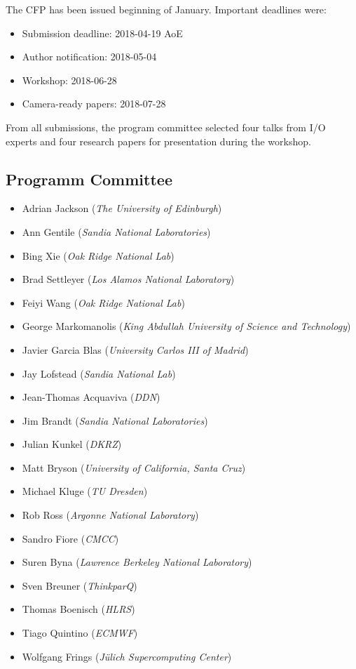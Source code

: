 \documentclass{llncs}
\begin{document}
\noindent The CFP has been issued beginning of January.
Important deadlines were:
\begin{itemize}
  \item Submission deadline: 2018-04-19  AoE
  \item Author notification: 2018-05-04
  \item Workshop: 2018-06-28
  \item Camera-ready papers: 2018-07-28
\end{itemize}

From all submissions, the program committee selected four talks from I/O experts and four research papers for presentation during the workshop.

\subsection{Programm Committee}
\begin{itemize}
\item Adrian Jackson (\textit{The University of Edinburgh})
\item Ann Gentile (\textit{Sandia National Laboratories})
\item Bing Xie (\textit{Oak Ridge National Lab})
\item Brad Settleyer (\textit{Los Alamos National Laboratory})
\item Feiyi Wang (\textit{Oak Ridge National Lab})
\item George Markomanolis (\textit{King Abdullah University of Science and Technology})
\item Javier Garcia Blas (\textit{University Carlos III of Madrid})
\item Jay Lofstead (\textit{Sandia National Lab})
\item Jean-Thomas Acquaviva (\textit{DDN})
\item Jim Brandt (\textit{Sandia National Laboratories})
\item Julian Kunkel (\textit{DKRZ})
\item Matt Bryson (\textit{University of California, Santa Cruz})
\item Michael Kluge (\textit{TU Dresden})
\item Rob Ross (\textit{Argonne National Laboratory})
\item Sandro Fiore (\textit{CMCC})
\item Suren Byna (\textit{Lawrence Berkeley National Laboratory})
\item Sven Breuner (\textit{ThinkparQ})
\item Thomas Boenisch (\textit{HLRS})
\item Tiago Quintino (\textit{ECMWF})
\item Wolfgang Frings (\textit{Jülich Supercomputing Center})
\end{itemize}
\end{document}
